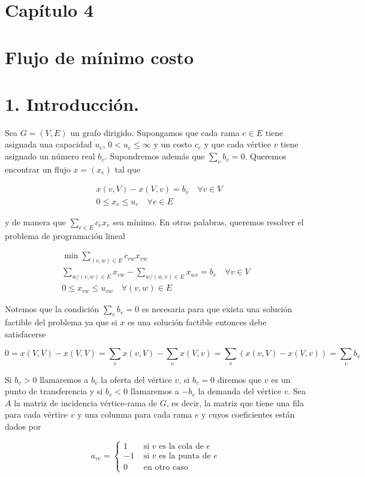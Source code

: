 \documentclass[10pt]{article}
\begin{document}
\section*{Capítulo 4}
\section*{Flujo de mínimo costo}
\section*{1. Introducción.}
Sea $G=(V, E)$ un grafo dirigido. Supongamos que cada rama $e \in E$ tiene asignada una capacidad $u_{e}$, $0<u_{e} \leq \infty$ y un costo $c_{e}$ y que cada vértice $v$ tiene asignado un número real $b_{v}$. Supondremos además que $\sum_{v} b_{v}=0$. Queremos encontrar un flujo $x=\left(x_{e}\right)$ tal que

$$
\begin{aligned}
& x(v, V)-x(V, v)=b_{v} \quad \forall v \in V \\
& 0 \leq x_{e} \leq u_{e} \quad \forall e \in E
\end{aligned}
$$

y de manera que $\sum_{e \in E} c_{e} x_{e}$ sea mínimo. En otras palabras, queremos resolver el problema de programación lineal

$$
\begin{gathered}
\min \sum_{(v, w) \in E} c_{v w} x_{v w} \\
\sum_{w /(v, w) \in E} x_{v w}-\sum_{w /(w, v) \in E} x_{w v}=b_{v} \quad \forall v \in V \\
0 \leq x_{v w} \leq u_{v w} \quad \forall(v, w) \in E
\end{gathered}
$$

Notemos que la condición $\sum_{v} b_{v}=0$ es necesaria para que exista una solución factible del problema ya que si $x$ es una solución factible entonces debe satisfacerse

$$
0=x(V, V)-x(V, V)=\sum_{v} x(v, V)-\sum_{v} x(V, v)=\sum_{v}(x(v, V)-x(V, v))=\sum_{v} b_{v}
$$

Si $b_{v}>0$ llamaremos a $b_{v}$ la oferta del vértice $v$, si $b_{v}=0$ diremos que $v$ es un punto de transferencia y si $b_{v}<0$ llamaremos a $-b_{v}$ la demanda del vértice $v$. Sea $A$ la matriz de incidencia vértice-rama de $G$, es decir, la matriz que tiene una fila para cada vértice $v$ y una columna para cada rama $e$ y cuyos coeficientes están dados por

$$
a_{v e}= \begin{cases}1 & \text { si } v \text { es la cola de } e \\ -1 & \text { si } v \text { es la punta de } e \\ 0 & \text { en otro caso }\end{cases}
$$
\end{document}
